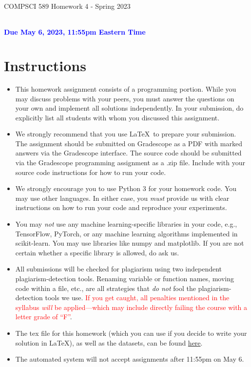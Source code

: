 \documentclass[letterpaper]{article}
\newcommand{\HIGHLIGHT}[1]{\textcolor{blue}{\textbf{#1}}}
\begin{document}
\newpage
\begin{center}
    \begin{Large}
    COMPSCI 589 Homework 4 - Spring 2023
    \end{Large}
    \\
    \HIGHLIGHT{Due May 6, 2023, 11:55pm Eastern Time}
\end{center}



\vspace{0.25in}
\section{Instructions}

\begin{itemize}
    \item This homework assignment consists of a programming portion. While you may discuss problems with your peers, you must answer the questions on your own and implement all solutions independently. In your submission, do explicitly list all students with whom you discussed this assignment. 
    \item We strongly recommend that you use \LaTeX~to prepare your submission. The assignment should be submitted on Gradescope as a PDF with marked answers via the Gradescope interface. The source code should be submitted via the Gradescope programming assignment as a .zip file. Include with your source code instructions for how to run your code. 
    \item We strongly encourage you to use Python 3 for your homework code. You may use other languages. In either case, you \textit{must} provide us with clear instructions on how to run your code and reproduce your experiments. 
    \item You may \textit{not} use any machine learning-specific libraries in your code, e.g., TensorFlow, PyTorch, or any machine learning algorithms implemented in scikit-learn. You may use libraries like numpy and matplotlib. If you are not certain whether a specific library is allowed, do ask us.
    \item All submissions will be checked for plagiarism using two independent plagiarism-detection tools. Renaming variable or function names, moving code within a file, etc., are all strategies that \textit{do not} fool the plagiarism-detection tools we use. \textcolor{red}{If you get caught, all penalties mentioned in the syllabus \textit{will} be applied---which may include directly failing the course with a letter grade of ``F''}.
    \item The tex file for this homework (which you can use if you decide to write your solution in \LaTeX), as well as the datasets, can be found \href{https://people.cs.umass.edu/~bsilva/courses/CMPSCI_589/Spring2023/homeworks/hw4.zip}{here}.
    \item The automated system will not accept assignments after 11:55pm on May 6. 
\end{itemize}
\end{document}
